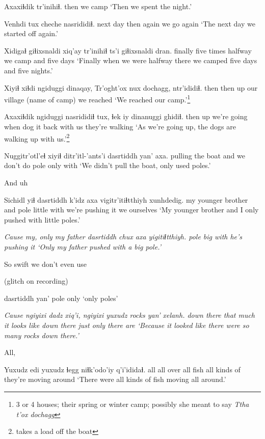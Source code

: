 \documentclass[12pt]{article}
\begin{document}
\gll Axaxiɬdik tr'inihiɬ.
then    {we camp}
\glt `Then  we spent the night.'
\glend

\gll Venhdi tux cheche nasrididiɬ.
{next day} then again  {we go again}
\glt `The next day we started off again.'
\glend

\gll Xidigaɬ giɬixsnaldi xiq'ay  tr'inihiɬ ts'i giɬixsnaldi dran.
finally {five times}  halfway {we camp}   and  five     days
\glt `Finally when we were halfway there we camped five days and five nights.'
\glend

\gll Xiyiɬ xiɬdi ngiduggi dinaqay, {Tr'oght'ox nux dochagg,}     ntr'ididiɬ.
then  then  up      {our village} {(name of camp)} {we reached}
\glt `We reached our camp.'\footnote{3 or 4 houses; their spring or winter camp; possibly she meant to say \em Ttha t'ox dochagg}
\glend

\gll Axaxiɬdik ngiduggi nasrididiɬ  tux, ɬek iy dinanuggi   ghidiɬ.
then    up      {we're going} when  dog it {back with us} {they're walking}
\glt `As we're going up, the dogs are walking up with us.'\footnote{takes a load off the boat}
\glend

\gll Nuggitr'otl'eɬ   xiyiɬ ditr'itl-'ants'i dasrtiddh yan' axa.
{pulling the boat} and  {we don't do}  pole     only with
\glt `We didn't pull the boat, only used poles.'
\glend

And uh

\gll Sichidl            yiɬ dasrtiddh k'idz  axa  vigitr'itiɬtthiyh xunhdedig.
{my younger brother} and pole    little with {we're pushing it}    {we   ourselves}
\glt `My younger brother and I only pushed with little poles.'
\glend

\gll \em{Cause my, only my father}	dasrtiddh chux axa yigitiɬtthiyh.
{}				pole      big  with {he's pushing it}
\glt `Only my father pushed with a big pole.'
\glend

So swift we don't even use 

(glitch on recording)

 dasrtiddh yan' 
{} pole      only 
\glt `only poles'
\glend

\gll \em Cause \em ngiyixi    dadz      xiq'i,     ngiyixi    yuxudz \em rocks  yan' xelanh.
{} {down there} {that much} {it looks like} {down there} just   {}  only {there are}
\glt `Because it looked like there were so many rocks down there.'
\glend

All, 

\gll Yuxudz edi        yuxudz ɬegg niɬk'odo'iy  q'i'ididaɬ.
all    {all over} all    fish {all kinds of} {they're moving around}
\glt `There were all kinds of fish moving all around.'
\glend
\end{document}
